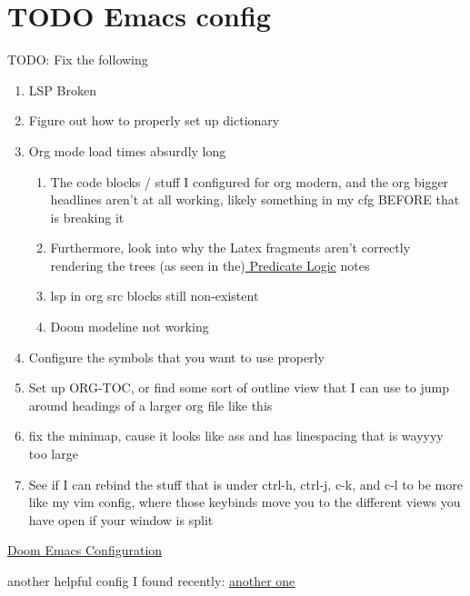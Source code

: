 \documentclass{article}
\author{Liam Wirth}
\date{\today}
\title{}
\begin{document}
\tableofcontents\newpage
\section{{\bfseries\sffamily TODO} Emacs config}
\label{sec:orge804ebc}
TODO: Fix the following
\begin{enumerate}
\item LSP Broken
\item Figure out how to properly set up dictionary
\item Org mode load times absurdly long
\begin{enumerate}
\item The code blocks / stuff I configured for org modern, and the org bigger headlines aren't at all working, likely something in my cfg BEFORE that is breaking it
\item Furthermore, look into why the Latex fragments aren't correctly rendering the trees (as seen in the)\href{roam/20240324021855-predicate\_logic\_as\_a\_formal\_language.org}{ Predicate Logic} notes
\item lsp in org src blocks still non-existent
\item Doom modeline not working
\end{enumerate}
\item Configure the symbols that you want to use properly
\item Set up ORG-TOC, or find some sort of outline view that I can use to jump around headings of a larger org file like this
\item fix the minimap, cause it looks like ass and has linespacing that is wayyyy too large
\item See if I can rebind the stuff that is under ctrl-h, ctrl-j, c-k, and c-l to be more like my vim config, where those keybinds move you to the different views you have open if your window is split
\end{enumerate}




\href{https://tecosaur.github.io/emacs-config/config.html}{Doom Emacs Configuration}

another helpful config I found recently:
\href{https://hieuphay.com/doom-emacs-config/}{another one}
\end{document}
